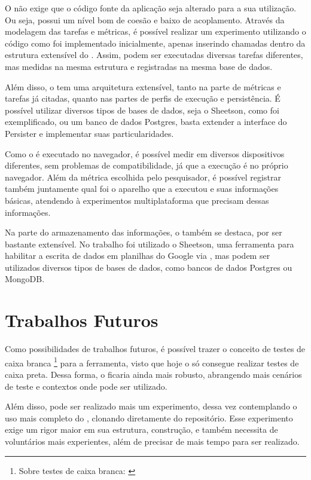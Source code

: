 \documentclass[12pt]{tcc}
\begin{document}
O  não exige que o código fonte da aplicação seja alterado para a sua utilização. Ou seja, possui um nível bom de coesão e baixo de acoplamento. Através da modelagem das tarefas e métricas, é possível realizar um experimento utilizando o código como foi implementado inicialmente, apenas inserindo chamadas dentro da estrutura extensível do . Assim, podem ser executadas diversas tarefas diferentes, mas medidas na mesma estrutura e registradas na mesma base de dados.

Além disso, o  tem uma arquitetura extensível, tanto na parte de métricas e tarefas já citadas, quanto nas partes de perfis de execução e persistência. É possível utilizar diversos tipos de bases de dados, seja o Sheetson, como foi exemplificado, ou um banco de dados Postgres, basta extender a interface do Persister e implementar suas particularidades. 

Como o  é executado no navegador, é possível medir em diversos dispositivos diferentes, sem problemas de compatibilidade, já que a execução é no próprio navegador. Além da métrica escolhida pelo pesquisador, é possível registrar também juntamente qual foi o aparelho que a executou e suas informações básicas, atendendo à experimentos multiplataforma que precisam dessas informações.

Na parte do armazenamento das informações, o  também se destaca, por ser bastante extensível. No trabalho foi utilizado o Sheetson, uma ferramenta para habilitar a escrita de dados em planilhas do Google via , mas podem ser utilizados diversos tipos de bases de dados, como bancos de dados Postgres ou MongoDB.

\section{Trabalhos Futuros}
\label{section:trabalhos-futuros}

Como possibilidades de trabalhos futuros, é possível trazer o conceito de testes de caixa branca \footnote{Sobre testes de caixa branca: \citep[Capítulo 21]{Sommerville2015Software}} para a ferramenta, visto que hoje o  só consegue realizar testes de caixa preta. Dessa forma, o  ficaria ainda mais robusto, abrangendo mais cenários de teste e contextos onde pode ser utilizado.

Além disso, pode ser realizado mais um experimento, dessa vez contemplando o uso mais completo do , clonando diretamente do repositório. Esse experimento exige um rigor maior em sua estrutura, construção, e também necessita de voluntários mais experientes, além de precisar de mais tempo para ser realizado.
\end{document}
